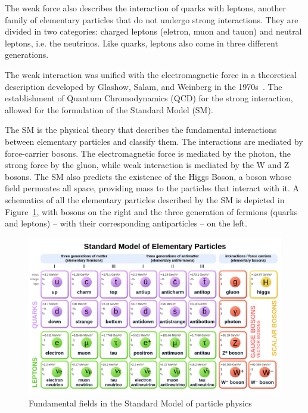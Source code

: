 The weak force also describes the interaction of quarks with leptons, another family of elementary particles that do not undergo strong interactions. They are divided in two categories: charged leptons (eletron, muon and tauon) and neutral leptons, i.e. the neutrinos. Like quarks, leptons also come in three different generations.  

The weak interaction was unified with the electromagnetic force in a theoretical description developed by Glashow, Salam, and Weinberg in the 1970s~\cite{Glashow:1961tr, Weinberg:1967tq, Salam:1968rm, Georgi:1974sy}. The establishment of Quantum Chromodynamics (QCD) for the strong interaction, allowed for the formulation of the Standard Model (SM). 

The SM is the physical theory that describes the fundamental interactions between elementary particles and classify them. The interactions are mediated by force-carrier bosons. The electromagnetic force is mediated by the photon, the strong force by the gluon, while weak interaction is mediated by the W and Z bosons. The SM also predicts the existence of the Higgs Boson, a boson whose field permeates all space, providing mass to the particles that interact with it. A schematics of all the elementary particles described by the SM is depicted in Figure~\ref{fig:SM}, with bosons on the right and the three generation of fermions (quarks and leptons) -- with their corresponding antiparticles -- on the left. 

\begin{figure}
    \centering
    \includegraphics[width=\textwidth]{figures/Standard_Model_of_Elementary_Particles_Anti.svg.png}
    \caption{Fundamental fields in the Standard Model of particle physics}
    \label{fig:SM}
\end{figure}



